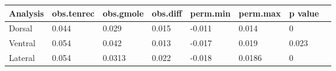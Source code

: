 \begin{tabular}[t]{l l l l l l l l }		
\hline
Analysis & obs.tenrec & obs.gmole & obs.diff & perm.min & perm.max & p value \\
\hline
Dorsal & 0.044 & 0.029 & 0.015 & -0.011 & 0.014 &  0 \\
Ventral &  0.054 & 0.042 & 0.013 & -0.017 & 0.019 &  0.023 \\
Lateral & 0.054 & 0.0313 & 0.022 & -0.018 & 0.0186 & 0 \\
\hline
\end{tabular}